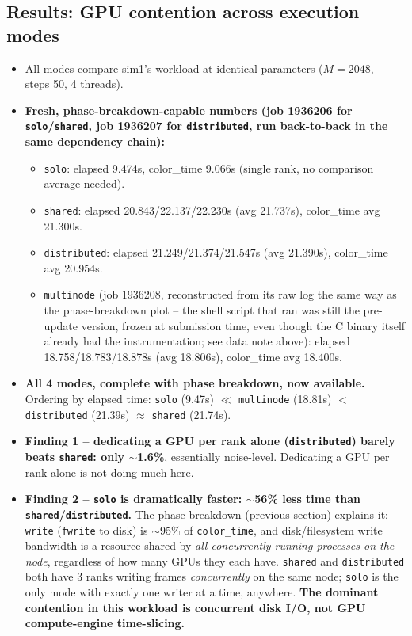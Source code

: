 \subsection{Results: GPU contention across execution modes}
\begin{itemize}
\item All modes compare sim1's workload at identical parameters ($M=2048$, --steps 50, 4 threads).
\item \textbf{Fresh, phase-breakdown-capable numbers (job 1936206 for \texttt{solo}/\texttt{shared}, job 1936207 for \texttt{distributed}, run back-to-back in the same dependency chain):}
\begin{itemize}
\item \texttt{solo}: elapsed 9.474s, color\_time 9.066s (single rank, no comparison average needed).
\item \texttt{shared}: elapsed 20.843/22.137/22.230s (avg 21.737s), color\_time avg 21.300s.
\item \texttt{distributed}: elapsed 21.249/21.374/21.547s (avg 21.390s), color\_time avg 20.954s.
\item \texttt{multinode} (job 1936208, reconstructed from its raw log the same way as the phase-breakdown plot -- the shell script that ran was still the pre-update version, frozen at submission time, even though the C binary itself already had the instrumentation; see data note above): elapsed 18.758/18.783/18.878s (avg 18.806s), color\_time avg 18.400s.
\end{itemize}
\item \textbf{All 4 modes, complete with phase breakdown, now available.} Ordering by elapsed time: \texttt{solo} (9.47s) $\ll$ \texttt{multinode} (18.81s) $<$ \texttt{distributed} (21.39s) $\approx$ \texttt{shared} (21.74s).
\item \textbf{Finding 1 -- dedicating a GPU per rank alone (\texttt{distributed}) barely beats \texttt{shared}: only $\sim$1.6\%}, essentially noise-level. Dedicating a GPU per rank alone is not doing much here.
\item \textbf{Finding 2 -- \texttt{solo} is dramatically faster: $\sim$56\% less time than \texttt{shared}/\texttt{distributed}.} The phase breakdown (previous section) explains it: \texttt{write} (\texttt{fwrite} to disk) is $\sim$95\% of \texttt{color\_time}, and disk/filesystem write bandwidth is a resource shared by \emph{all concurrently-running processes on the node}, regardless of how many GPUs they each have. \texttt{shared} and \texttt{distributed} both have 3 ranks writing frames \emph{concurrently} on the same node; \texttt{solo} is the only mode with exactly one writer at a time, anywhere. \textbf{The dominant contention in this workload is concurrent disk I/O, not GPU compute-engine time-slicing.}

\end{itemize}
